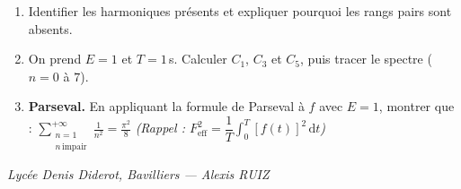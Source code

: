 \documentclass[a4paper,11pt]{article}
\begin{document}
\begin{enumerate}[label=\textbf{\arabic*.}]
  \item Identifier les harmoniques présents et expliquer pourquoi les rangs pairs sont absents.
  \begin{tcolorbox}[reponsebox, height=2cm]\end{tcolorbox}

  \item On prend $E = 1$ et $T = 1$\,s. Calculer $C_1$, $C_3$ et $C_5$, puis tracer le spectre ($n = 0$ à $7$).
  \begin{tcolorbox}[reponsebox]
  \vspace{0.5cm}
  \begin{center}
  \end{center}
  \end{tcolorbox}

  \item \textbf{Parseval.} En appliquant la formule de Parseval à $f$ avec $E=1$, montrer que :
        $\displaystyle\sum_{\substack{n=1\\n\,\text{impair}}}^{+\infty}\frac{1}{n^2} = \frac{\pi^2}{8}$
        \quad\textit{(Rappel : $F_{\mathrm{eff}}^2 = \dfrac{1}{T}\displaystyle\int_0^T [f(t)]^2\,\mathrm{d}t$)}
  \begin{tcolorbox}[reponsebox, height=5cm]\end{tcolorbox}
\end{enumerate}

\vfill
\begin{center}
\small\color{gray}\textit{Lycée Denis Diderot, Bavilliers — Alexis RUIZ}
\end{center}
\end{document}
